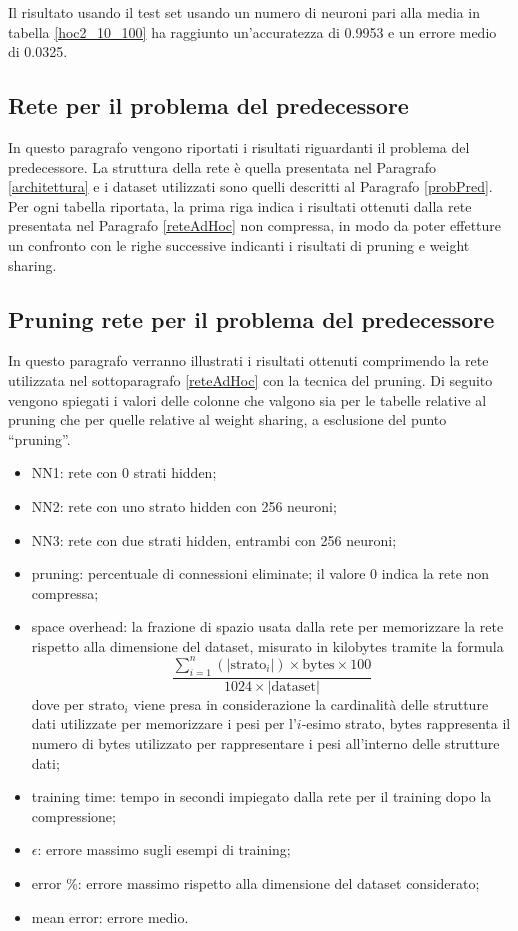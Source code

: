 \documentclass[12pt]{report}
\begin{document}
Il risultato usando il test set usando un numero di neuroni pari alla media in tabella \ref{hoc2_10_100} ha raggiunto un'accuratezza di 0.9953 e un errore medio di 0.0325.

\newpage

\subsection{Rete per il problema del predecessore}
In questo paragrafo vengono riportati i risultati riguardanti il problema del predecessore.
La struttura della rete è quella presentata nel Paragrafo \ref{architettura} e i dataset utilizzati sono quelli descritti al Paragrafo \ref{probPred}.
Per ogni tabella riportata, la prima riga indica i risultati ottenuti dalla rete presentata nel Paragrafo \ref{reteAdHoc} non compressa, in modo da poter effetture un confronto con le righe successive indicanti i risultati di pruning e weight sharing.

\subsection{Pruning rete per il problema del predecessore} \label{CSRProblem}
In questo paragrafo verranno illustrati i risultati ottenuti comprimendo la rete utilizzata nel sottoparagrafo \ref{reteAdHoc} con la tecnica del pruning.
Di seguito vengono spiegati i valori delle colonne che valgono sia per le tabelle relative al pruning che per quelle relative al weight sharing, a esclusione del punto ``pruning''.
\begin{itemize}
\item{NN1}: rete con 0 strati hidden;
\item{NN2}: rete con uno strato hidden con 256 neuroni;
\item{NN3}: rete con due strati hidden, entrambi con 256 neuroni;
\item{pruning}: percentuale di connessioni eliminate; il valore 0 indica la rete non compressa;
\item{space overhead}: la frazione di spazio usata dalla rete per memorizzare la rete rispetto alla dimensione del dataset, misurato in kilobytes tramite la formula 
$$\displaystyle{\frac{\sum_{i=1}^n \left(|\mathrm{strato}_i|\right) \times \mathrm{bytes} \times 100}{1024 \times \left| \mathrm{dataset} \right|}}$$ dove per $\mathrm{strato}_i$ viene presa in considerazione la cardinalità delle strutture dati utilizzate per memorizzare i pesi per l'$i$-esimo strato, bytes rappresenta il numero di bytes utilizzato per rappresentare i pesi all'interno delle strutture dati;
\item{training time}: tempo in secondi impiegato dalla rete per il training dopo la compressione;
\item{$\epsilon$}: errore massimo sugli esempi di training;
\item{error \%}: errore massimo rispetto alla dimensione del dataset considerato;
\item{mean error}: errore medio.
\end{itemize}
\par\null\par
\par\null\par
\end{document}
